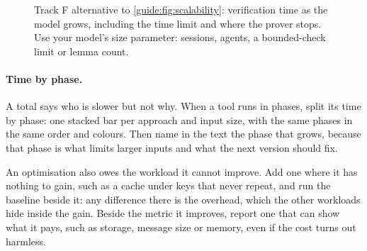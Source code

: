 \begin{figure}[!ht]
  \centering
  \caption{Track F alternative to \cref{guide:fig:scalability}: verification time as the model grows, including the time limit and where the prover stops. Use your model's size parameter: sessions, agents, a bounded-check limit or lemma count.}
  \label{guide:fig:scalability-formal}
\end{figure}

\paragraph{Time by phase.} A total says who is slower but not why. When a tool runs in phases, split its time by phase: one stacked bar per approach and input size, with the same phases in the same order and colours. Then name in the text the phase that grows, because that phase is what limits larger inputs and what the next version should fix.

An optimisation also owes the workload it cannot improve. Add one where it has nothing to gain, such as a cache under keys that never repeat, and run the baseline beside it: any difference there is the overhead, which the other workloads hide inside the gain. Beside the metric it improves, report one that can show what it pays, such as storage, message size or memory, even if the cost turns out harmless.

